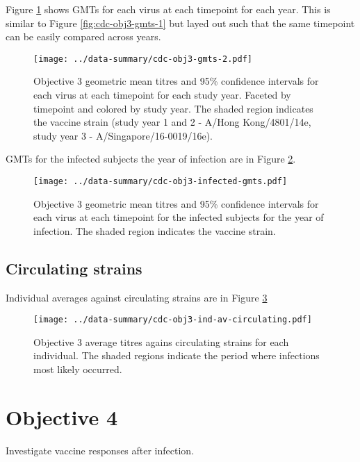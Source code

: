 \documentclass[12pt]{article}
\begin{document}
Figure \ref{fig:cdc-obj3-gmts-2} shows GMTs for each virus at each timepoint for each year. This is similar to Figure \ref{fig:cdc-obj3-gmts-1} but layed out such that the same timepoint can be easily compared across years.

\begin{figure}
	\texttt{[image: ../data-summary/cdc-obj3-gmts-2.pdf]}
	\caption{Objective 3 geometric mean titres and 95\% confidence intervals for each virus at each timepoint for each study year. Faceted by timepoint and colored by study year. The shaded region indicates the vaccine strain (study year 1 and 2 - A/Hong Kong/4801/14e, study year 3 - A/Singapore/16-0019/16e).}
	\label{fig:cdc-obj3-gmts-2}
\end{figure}

GMTs for the infected subjects the year of infection are in Figure \ref{fig:cdc-obj3-infected-gmts}.

\begin{figure}
	\texttt{[image: ../data-summary/cdc-obj3-infected-gmts.pdf]}
	\caption{Objective 3 geometric mean titres and 95\% confidence intervals for each virus at each timepoint for the infected subjects for the year of infection. The shaded region indicates the vaccine strain.}
	\label{fig:cdc-obj3-infected-gmts}
\end{figure}

\subsection{Circulating strains}

Individual averages against circulating strains are in Figure \ref{fig:cdc-obj3-ind-av-circulating}

\begin{figure}
	\centering
	\texttt{[image: ../data-summary/cdc-obj3-ind-av-circulating.pdf]}
	\caption{Objective 3 average titres agains circulating strains for each individual. The shaded regions indicate the period where infections most likely occurred.}
	\label{fig:cdc-obj3-ind-av-circulating}
\end{figure}

\section{Objective 4}

Investigate vaccine responses after infection.
\end{document}
